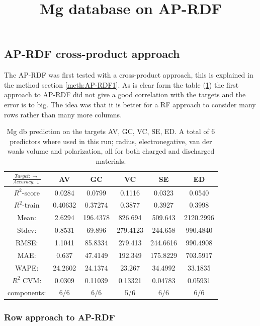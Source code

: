 \subsection{AP-RDF cross-product approach}

The AP-RDF was first tested with a cross-product approach, this is explained in the method section \ref{meth:AP-RDF1}. As is clear form the table (\ref{tab:Mg-APRDF1}) the first approach to AP-RDF did not give a good correlation with the targets and the error is to big. The idea was that it is better for a RF approach to consider many rows rather than many more columns. 

\begin{table}[H]
\scriptsize
\centering
\caption{Mg db prediction on the targets AV, GC, VC, SE, ED. A total of 6 predictors where used in this run; radius, electronegative, van der waals volume and polarization, all for both charged and discharged materials. }
\title{Mg database on AP-RDF}
\begin{tabular}{|c|c|c|c|c|c|}
	\hline 
	$\frac{Target: \rightarrow}{Accuracy:\downarrow} $ & AV & GC & VC & SE & ED 
	 \\ 
	\hline
	$R^2$-score &  0.0284 & 0.0799 & 0.1116 &  0.0323 &  0.0540\\ 
	\hline 
	$R^2$-train & 0.40632 &   0.37274 & 0.3877 &  0.3927 & 0.3998 \\ 
	\hline
	Mean: & 2.6294&196.4378&826.694	&509.643	& 2120.2996	\\
	\hline 
	Stdev: &0.8531	&69.896	&279.4123&244.658	&990.4840	\\
	\hline 
	RMSE: &1.1041& 85.8334 &  279.413 &  244.6616 & 990.4908 \\ 
	\hline
	MAE: & 0.637 & 47.4149& 192.349 &  175.8229 & 703.5917 \\ 
	\hline
	WAPE: & 24.2602 & 24.1374 & 23.267  & 34.4992 & 33.1835 \\
	\hline
	$R^2$ CVM: &  0.0309 & 0.11039 & 0.13321  & 0.04783 & 0.05931 \\
	\hline
	components: & 6/6 & 6/6  & 5/6   & 6/6 & 6/6  \\
	\hline
\end{tabular}
\label{tab:Mg-APRDF1}
\end{table}

    
\subsubsection{Row approach to AP-RDF }%

